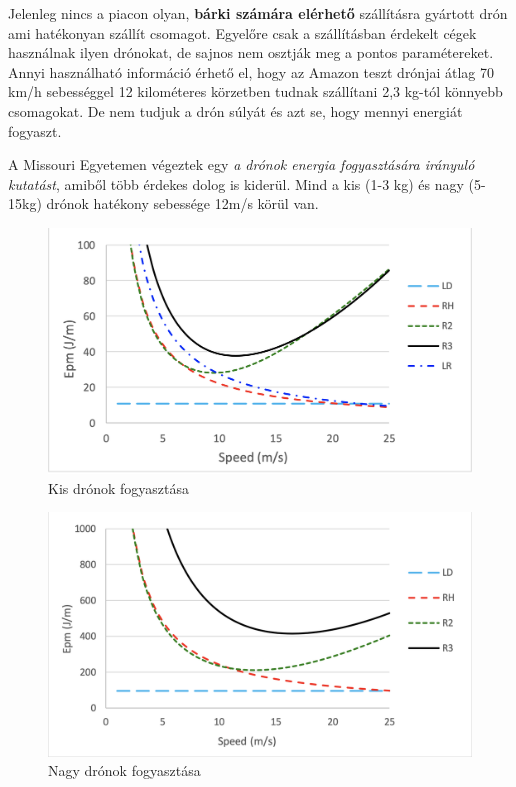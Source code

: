 Jelenleg nincs a piacon olyan, \textbf{bárki számára elérhető} szállításra gyártott drón ami hatékonyan szállít csomagot. Egyelőre csak a szállításban
érdekelt cégek használnak ilyen drónokat, de sajnos nem osztják meg a pontos paramétereket. Annyi használható
információ érhető el, hogy az Amazon teszt drónjai átlag 70 km/h sebességgel 12 kilométeres körzetben tudnak szállítani
2,3 kg-tól könnyebb csomagokat.
De nem tudjuk a drón súlyát és azt se, hogy mennyi energiát fogyaszt.

A Missouri Egyetemen végeztek egy \textit{a drónok energia fogyasztására irányuló kutatást}\cite{dron-szallitas-kutatas},
amiből több érdekes dolog is kiderül. Mind a kis (1-3 kg) és nagy (5-15kg) drónok hatékony sebessége  12m/s körül van.

\begin{figure}[h]
    \centering
    \includegraphics[scale=0.4]{images/fogyasztas-kis-dronok.png}
    \caption{Kis drónok fogyasztása}
    \label{fig:kis}
\end{figure}


\begin{figure}[h]
    \centering
    \includegraphics[scale=0.4]{images/fogyasztas-nagy-dronok.png}
    \caption{Nagy drónok fogyasztása}
    \label{fig:nagy}
\end{figure}


